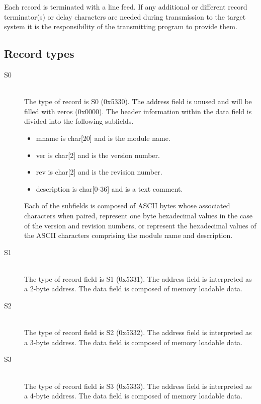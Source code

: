     Each record is terminated with a line feed. If any additional or different record terminator(s) or delay characters are needed during transmission to the target system it is the responsibility of the transmitting program to provide them.

    \subsection{Record types}
        \begin{description}
            \item[S0]~\\
                The type of record is S0 (0x5330). The address field is unused and will be filled with zeros (0x0000). The header information within the data field is divided into the following subfields.

                \begin{itemize}
                    \item mname is char[20] and is the module name.
                    \item ver is char[2] and is the version number.
                    \item rev is char[2] and is the revision number.
                    \item description is char[0-36] and is a text comment.
                \end{itemize}

                Each of the subfields is composed of ASCII bytes whose associated characters when paired, represent one byte hexadecimal values in the case of the version and revision numbers, or represent the hexadecimal values of the ASCII characters comprising the module name and description.

            \item[S1]~\\
                The type of record field is S1 (0x5331). The address field is interpreted as a 2-byte address. The data field is composed of memory loadable data.

            \item[S2]~\\
                The type of record field is S2 (0x5332). The address field is interpreted as a 3-byte address. The data field is composed of memory loadable data.

            \item[S3]~\\
                The type of record field is S3 (0x5333). The address field is interpreted as a 4-byte address. The data field is composed of memory loadable data.


\end{description}

